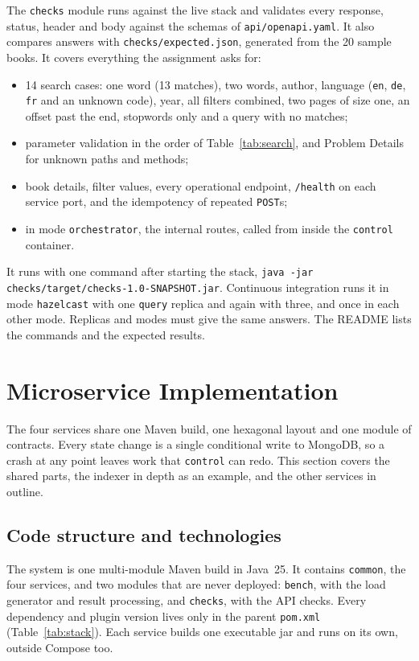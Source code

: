 \documentclass[11pt,a4paper]{article}
\newcommand{\code}[1]{\nolinkurl{#1}}
\newcommand{\mode}[1]{\code{#1}}
\begin{document}
The \code{checks} module runs against the live stack and validates every response, status, header and body against
the schemas of \code{api/openapi.yaml}. It also compares answers with \code{checks/expected.json}, generated from the
20 sample books. It covers everything the assignment asks for:
\begin{itemize}
\item 14 search cases: one word (13 matches), two words, author, language (\code{en}, \code{de}, \code{fr} and an
  unknown code), year, all filters combined, two pages of size one, an offset past the end, stopwords only and a query
  with no matches;
\item parameter validation in the order of Table~\ref{tab:search}, and Problem Details for unknown paths and methods;
\item book details, filter values, every operational endpoint, \code{/health} on each service port, and the
  idempotency of repeated \code{POST}s;
\item in mode \mode{orchestrator}, the internal routes, called from inside the \code{control} container.
\end{itemize}
It runs with one command after starting the stack, \code{java -jar checks/target/checks-1.0-SNAPSHOT.jar}.
Continuous integration runs it in mode \mode{hazelcast} with one \code{query} replica and again with three, and once in
each other mode. Replicas and modes must give the same answers. The README lists the commands and the expected
results.
\section{Microservice Implementation}
\label{sec:implementation}

The four services share one Maven build, one hexagonal layout and one module of contracts. Every state change is a
single conditional write to MongoDB, so a crash at any point leaves work that \code{control} can redo. This section
covers the shared parts, the indexer in depth as an example, and the other services in outline.

\subsection{Code structure and technologies}

The system is one multi-module Maven build in Java~25. It contains \code{common}, the four services, and two modules
that are never deployed: \code{bench}, with the load generator and result processing, and \code{checks}, with the API
checks. Every dependency and plugin version lives only in the parent \code{pom.xml} (Table~\ref{tab:stack}). Each
service builds one executable jar and runs on its own, outside Compose too.
\end{document}
